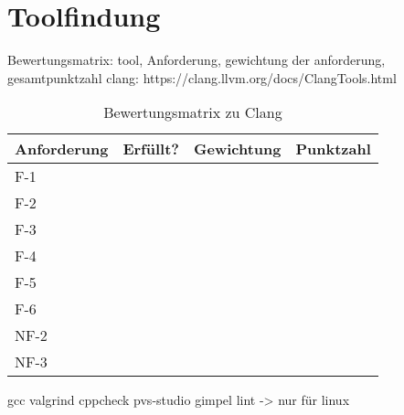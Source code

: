 \chapter{Toolfindung}
\label{ch:toolfindung}

Bewertungsmatrix: tool, Anforderung, gewichtung der anforderung, gesamtpunktzahl
clang: https://clang.llvm.org/docs/ClangTools.html
\begin{table}[H]
    {
        \begin{tabularx}{\linewidth}{|X|X|p{2cm}|X|}
            \hline
            Anforderung & Erfüllt? & Gewichtung & Punktzahl \\
            \hline
            \cline{1-4}
            F-1         &          &            &           \\
            \cline{1-4}
            F-2         &          &            &           \\
            \cline{1-4}
            F-3         &          &            &           \\
            \cline{1-4}
            F-4         &          &            &           \\
            \cline{1-4}
            F-5         &          &            &           \\
            \cline{1-4}
            F-6         &          &            &           \\
            \cline{1-4}
            NF-2        &          &            &           \\
            \cline{1-4}
            NF-3        &          &            &           \\
            \hline
        \end{tabularx}
    }
    \caption{Bewertungsmatrix zu Clang}
    \label{tab:clang}
\end{table}

gcc
valgrind
cppcheck
pvs-studio
gimpel lint -> nur für linux
